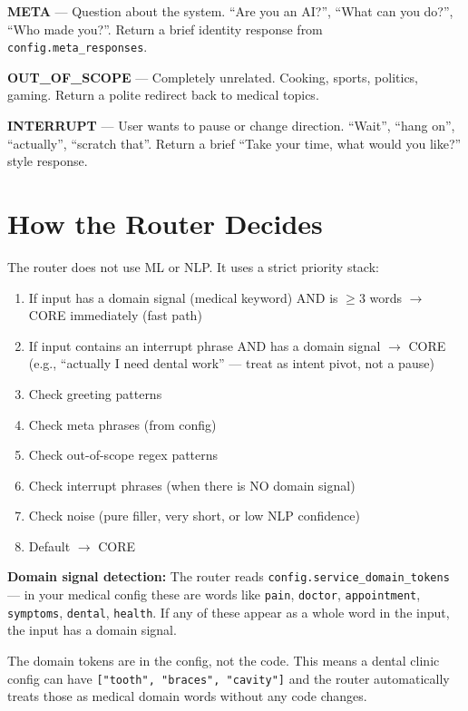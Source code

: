 \documentclass[12pt, a4paper]{report}
\newcommand{\ic}[1]{\texttt{\small\color{accentblue!70!black}#1}}
\begin{document}
\textbf{META} --- Question about the system. ``Are you an AI?'', ``What can you do?'',
``Who made you?''. Return a brief identity response from \ic{config.meta\_responses}.

\textbf{OUT\_OF\_SCOPE} --- Completely unrelated. Cooking, sports, politics, gaming.
Return a polite redirect back to medical topics.

\textbf{INTERRUPT} --- User wants to pause or change direction. ``Wait'', ``hang on'',
``actually'', ``scratch that''. Return a brief ``Take your time, what would you like?''
style response.

\section{How the Router Decides}

The router does not use ML or NLP. It uses a strict priority stack:

\begin{enumerate}
  \item If input has a domain signal (medical keyword) AND is $\geq$3 words $\to$ CORE
        immediately (fast path)
  \item If input contains an interrupt phrase AND has a domain signal $\to$ CORE
        (e.g., ``actually I need dental work'' --- treat as intent pivot, not a pause)
  \item Check greeting patterns
  \item Check meta phrases (from config)
  \item Check out-of-scope regex patterns
  \item Check interrupt phrases (when there is NO domain signal)
  \item Check noise (pure filler, very short, or low NLP confidence)
  \item Default $\to$ CORE
\end{enumerate}

\textbf{Domain signal detection:} The router reads
\ic{config.service\_domain\_tokens} --- in your medical config these are words like
\ic{pain}, \ic{doctor}, \ic{appointment}, \ic{symptoms}, \ic{dental}, \ic{health}. If
any of these appear as a whole word in the input, the input has a domain signal.

The domain tokens are in the config, not the code. This means a dental clinic config
can have \ic{["tooth", "braces", "cavity"]} and the router automatically treats those as
medical domain words without any code changes.
\end{document}
